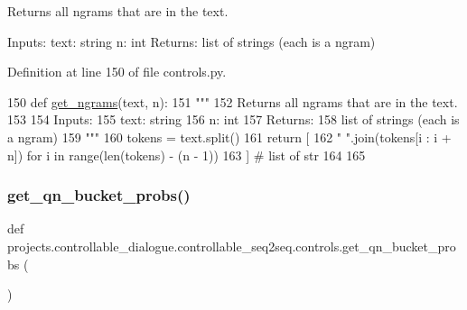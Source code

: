 \begin{DoxyVerb}Returns all ngrams that are in the text.

Inputs:
    text: string
    n: int
Returns:
    list of strings (each is a ngram)
\end{DoxyVerb}
 

Definition at line 150 of file controls.\+py.


\begin{DoxyCode}
150 \textcolor{keyword}{def }\hyperlink{namespaceprojects_1_1controllable__dialogue_1_1controllable__seq2seq_1_1controls_abf6d099074de6b0c663333470eeaa2de}{get\_ngrams}(text, n):
151     \textcolor{stringliteral}{"""}
152 \textcolor{stringliteral}{    Returns all ngrams that are in the text.}
153 \textcolor{stringliteral}{}
154 \textcolor{stringliteral}{    Inputs:}
155 \textcolor{stringliteral}{        text: string}
156 \textcolor{stringliteral}{        n: int}
157 \textcolor{stringliteral}{    Returns:}
158 \textcolor{stringliteral}{        list of strings (each is a ngram)}
159 \textcolor{stringliteral}{    """}
160     tokens = text.split()
161     \textcolor{keywordflow}{return} [
162         \textcolor{stringliteral}{" "}.join(tokens[i : i + n]) \textcolor{keywordflow}{for} i \textcolor{keywordflow}{in} range(len(tokens) - (n - 1))
163     ]  \textcolor{comment}{# list of str}
164 
165 
\end{DoxyCode}
\mbox{\label{namespaceprojects_1_1controllable__dialogue_1_1controllable__seq2seq_1_1controls_a3a84e701c32a5fbb01d5676714d83f03}} 
\subsubsection{\texorpdfstring{get\+\_\+qn\+\_\+bucket\+\_\+probs()}{get\_qn\_bucket\_probs()}}
{\footnotesize\ttfamily def projects.\+controllable\+\_\+dialogue.\+controllable\+\_\+seq2seq.\+controls.\+get\+\_\+qn\+\_\+bucket\+\_\+probs (\begin{DoxyParamCaption}{ }\end{DoxyParamCaption})}

